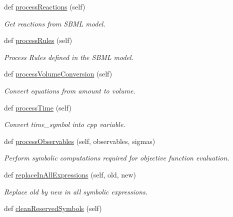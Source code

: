 \begin{DoxyCompactItemize}
def \mbox{\hyperlink{classamici_1_1sbml__import_1_1_sbml_importer_adbdd8e9af99679633109829d94b3fd3e}{process\+Reactions}} (self)
\begin{DoxyCompactList}\small\item\em Get reactions from S\+B\+ML model. \end{DoxyCompactList}\item 
def \mbox{\hyperlink{classamici_1_1sbml__import_1_1_sbml_importer_a7df6b4ae4e3e757bc8de5e0cc54fe16b}{process\+Rules}} (self)
\begin{DoxyCompactList}\small\item\em Process Rules defined in the S\+B\+ML model. \end{DoxyCompactList}\item 
def \mbox{\hyperlink{classamici_1_1sbml__import_1_1_sbml_importer_af2a2cbf8550d30fc0e95a875758b8262}{process\+Volume\+Conversion}} (self)
\begin{DoxyCompactList}\small\item\em Convert equations from amount to volume. \end{DoxyCompactList}\item 
def \mbox{\hyperlink{classamici_1_1sbml__import_1_1_sbml_importer_a2819c6ad1b541e49e728aa172e57208e}{process\+Time}} (self)
\begin{DoxyCompactList}\small\item\em Convert time\+\_\+symbol into cpp variable. \end{DoxyCompactList}\item 
def \mbox{\hyperlink{classamici_1_1sbml__import_1_1_sbml_importer_a903b87aa6c483832424fa2cc76adc4d5}{process\+Observables}} (self, observables, sigmas)
\begin{DoxyCompactList}\small\item\em Perform symbolic computations required for objective function evaluation. \end{DoxyCompactList}\item 
def \mbox{\hyperlink{classamici_1_1sbml__import_1_1_sbml_importer_a1579faf8b188de11ed58ddbebc3c20a7}{replace\+In\+All\+Expressions}} (self, old, new)
\begin{DoxyCompactList}\small\item\em Replace \textquotesingle{}old\textquotesingle{} by \textquotesingle{}new\textquotesingle{} in all symbolic expressions. \end{DoxyCompactList}\item 
def \mbox{\hyperlink{classamici_1_1sbml__import_1_1_sbml_importer_a122b9921e2fb5bd0fc75310c47413dd1}{clean\+Reserved\+Symbols}} (self)

\end{DoxyCompactItemize}
